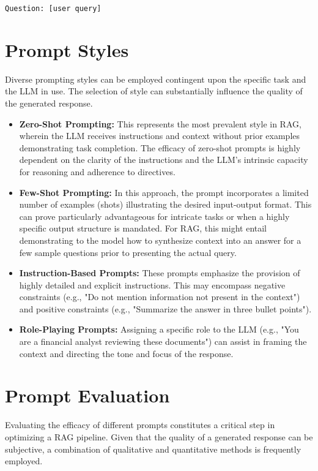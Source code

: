\texttt{Question: [user query]}

\section{Prompt Styles}
Diverse prompting styles can be employed contingent upon the specific task and the LLM in use. The selection of style can substantially influence the quality of the generated response.

\begin{itemize}
    \item \textbf{Zero-Shot Prompting:} This represents the most prevalent style in RAG, wherein the LLM receives instructions and context without prior examples demonstrating task completion. The efficacy of zero-shot prompts is highly dependent on the clarity of the instructions and the LLM's intrinsic capacity for reasoning and adherence to directives.
    
    \item \textbf{Few-Shot Prompting:} In this approach, the prompt incorporates a limited number of examples (shots) illustrating the desired input-output format. This can prove particularly advantageous for intricate tasks or when a highly specific output structure is mandated. For RAG, this might entail demonstrating to the model how to synthesize context into an answer for a few sample questions prior to presenting the actual query.
    
    \item \textbf{Instruction-Based Prompts:} These prompts emphasize the provision of highly detailed and explicit instructions. This may encompass negative constraints (e.g., "Do not mention information not present in the context") and positive constraints (e.g., "Summarize the answer in three bullet points").
    
    \item \textbf{Role-Playing Prompts:} Assigning a specific role to the LLM (e.g., "You are a financial analyst reviewing these documents") can assist in framing the context and directing the tone and focus of the response.
\end{itemize}

\section{Prompt Evaluation}
Evaluating the efficacy of different prompts constitutes a critical step in optimizing a RAG pipeline. Given that the quality of a generated response can be subjective, a combination of qualitative and quantitative methods is frequently employed.

